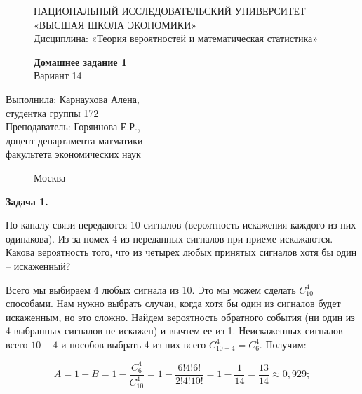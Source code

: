 \documentclass[]{article}
\begin{document}
	\begin{figure}[t]
		\centering
		\large
		НАЦИОНАЛЬНЫЙ ИССЛЕДОВАТЕЛЬСКИЙ УНИВЕРСИТЕТ\\
		«ВЫСШАЯ ШКОЛА ЭКОНОМИКИ»\\
		Дисциплина: «Теория вероятностей и математическая статистика»
	\end{figure}
	
	\begin{figure}[h]
	\vspace{3in}
	\centering
	\Huge
	\textbf{Домашнее задание 1}\\
	Вариант 14 
	\end{figure}
	
	\vspace{2in}
	\Large
	\raggedleft
	Выполнила: Карнаухова Алена,\\
	студентка группы 172\\
	\vspace{12pt}
	Преподаватель: Горяинова Е.Р.,\\
	доцент департамента матматики\\
	факультета экономических наук
	
	\begin{figure}[b]
		\centering
		Москва \the\year
	\end{figure}
	
	\thispagestyle{empty}
	
	\newpage
	
	\centering
	\large
	\textbf{Задача 1.}
	
	\vspace{10pt}
	
	\raggedright

	По каналу связи передаются 10 сигналов (вероятность искажения каждого
из них одинакова). Из-за помех 4 из переданных сигналов при приеме искажаются. Какова
вероятность того, что из четырех любых принятых сигналов хотя бы один – искаженный?	

	\vspace{20pt}
	
	Всего мы выбираем 4 любых сигнала из 10. Это мы можем сделать $C_{10}^4$ способами. Нам нужно выбрать случаи, когда хотя бы один из сигналов будет искаженным, но это сложно. Найдем вероятность обратного события (ни один из 4 выбранных сигналов не искажен) и вычтем ее из 1. Неискаженных сигналов всего $10-4$ и пособов выбрать 4 из них всего $C_{10-4}^4 = C_{6}^4$. Получим:
	
	\begin{equation}
	A = 1 - B = 1 - \frac{C_6^4}{C_{10}^4} = 1 - \frac{6!4!6!}{2!4!10!} = 1 - \frac{1}{14} = \frac{13}{14} \approx 0,929;
	\end{equation}
	
\end{document}
